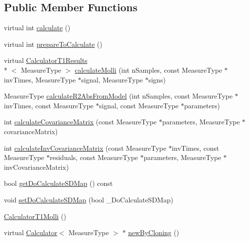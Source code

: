 \subsection*{Public Member Functions}
\begin{DoxyCompactItemize}
\item 
virtual int \hyperlink{class_ox_1_1_calculator_t1_molli_a6f15bc9c026305248c927d62748903bf}{calculate} ()
\item 
virtual int \hyperlink{class_ox_1_1_calculator_t1_molli_a591ec9658fb5a3e4f48715057cf62b38}{prepare\-To\-Calculate} ()
\item 
virtual \hyperlink{struct_ox_1_1_calculator_t1_results}{Calculator\-T1\-Results}\\*
$<$ Measure\-Type $>$ \hyperlink{class_ox_1_1_calculator_t1_molli_a9cb84f5e8680e1bf6c3543846fc90c4d}{calculate\-Molli} (int n\-Samples, const Measure\-Type $\ast$inv\-Times, Measure\-Type $\ast$signal, Measure\-Type $\ast$signs)
\item 
Measure\-Type \hyperlink{class_ox_1_1_calculator_t1_molli_a9c9238dd8a96e06d3e0a96810377b90b}{calculate\-R2\-Abs\-From\-Model} (int n\-Samples, const Measure\-Type $\ast$inv\-Times, const Measure\-Type $\ast$signal, const Measure\-Type $\ast$parameters)
\item 
int \hyperlink{class_ox_1_1_calculator_t1_molli_a030582bca754a7b81febfae53fe0c10c}{calculate\-Covariance\-Matrix} (const Measure\-Type $\ast$parameters, Measure\-Type $\ast$covariance\-Matrix)
\item 
int \hyperlink{class_ox_1_1_calculator_t1_molli_aec374fc512aa3b109138f0c16c53a171}{calculate\-Inv\-Covariance\-Matrix} (const Measure\-Type $\ast$inv\-Times, const Measure\-Type $\ast$residuals, const Measure\-Type $\ast$parameters, Measure\-Type $\ast$inv\-Covariance\-Matrix)
\item 
bool \hyperlink{class_ox_1_1_calculator_t1_molli_a06d8579492ee063b129b489e638333be}{get\-Do\-Calculate\-S\-D\-Map} () const 
\item 
void \hyperlink{class_ox_1_1_calculator_t1_molli_a65a51dcadaafdefc576201de535f8810}{set\-Do\-Calculate\-S\-D\-Map} (bool \-\_\-\-Do\-Calculate\-S\-D\-Map)
\item 
\hyperlink{class_ox_1_1_calculator_t1_molli_ab1892de078822ea106fcaebcf81047be}{Calculator\-T1\-Molli} ()
\item 
virtual \hyperlink{class_ox_1_1_calculator}{Calculator}$<$ Measure\-Type $>$ $\ast$ \hyperlink{class_ox_1_1_calculator_t1_molli_a2a924ff09d446b51542dc246a6a04bd3}{new\-By\-Cloning} ()
\end{DoxyCompactItemize}
